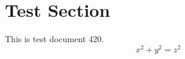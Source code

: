 \documentclass{article}
\begin{document}
\section{Test Section}
This is test document 420.
\begin{equation}
x^2 + y^2 = z^2
\end{equation}
\end{document}
